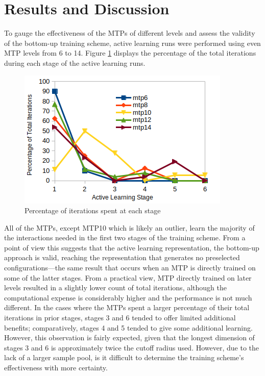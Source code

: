 \documentclass[9pt,twocolumn,twoside]{opticajnl}
\begin{document}
\section{Results and Discussion}
To gauge the effectiveness of the MTPs of different levels and assess the validity of the bottom-up training scheme, active learning runs were performed using even MTP levels from 6 to 14. Figure \ref{fig:iterations} displays the percentage of the total iterations during each stage of the active learning runs. 

\begin{figure}[ht]
  \centering
  \includegraphics[width=\linewidth]{assets/iterations.png}
  \caption{Percentage of iterations spent at each stage}
  \label{fig:iterations}
\end{figure}

All of the MTPs, except MTP10 which is likely an outlier, learn the majority of the interactions needed in the first two stages of the training scheme. From a point of view this suggests that the active learning representation, the bottom-up approach is valid, reaching the representation that generates no preselected configurations—the same result that occurs when an MTP is directly trained on some of the latter stages. From a practical view, MTP directly trained on later levels resulted in a slightly lower count of total iterations, although the computational expense is considerably higher and the performance is not much different. In the cases where the MTPs spent a larger percentage of their total iterations in prior stages, stages 3 and 6 tended to offer limited additional benefits; comparatively, stages 4 and 5 tended to give some additional learning. However, this observation is fairly expected, given that the longest dimension of stages 3 and 6 is approximately twice the cutoff radius used. However, due to the lack of a larger sample pool, is it difficult to determine the training scheme's effectiveness with more certainty. 
\end{document}
